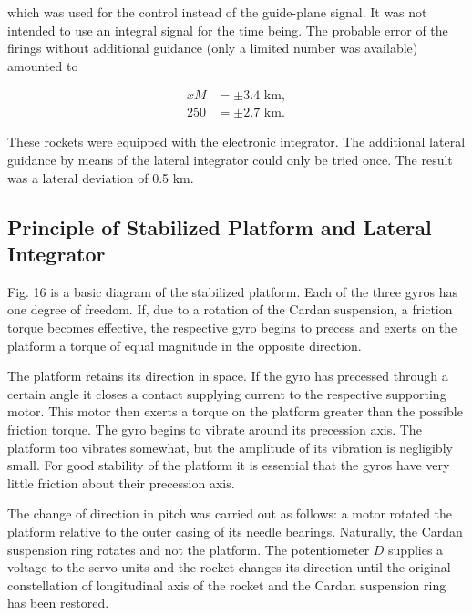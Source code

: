 \documentclass[12pt, a4paper]{article}
\begin{document}
\begin{equation}
\end{equation}

which was used for the control instead of the guide-plane signal. It was not intended to use an integral signal for the time being. The probable error of the firings without additional guidance (only a limited number was available) amounted to

\begin{equation*}
  \begin{split}
    x M&=\pm3.4\text{ km},\\
    250&=\pm2.7\text{ km}.
  \end{split}
\end{equation*}

These rockets were equipped with the electronic integrator. The additional lateral guidance by means of the lateral integrator could only be tried once. The result was a lateral deviation of 0.5 km.

\subsection{Principle of Stabilized Platform and Lateral Integrator}

Fig. 16 is a basic diagram of the stabilized platform. Each of the three gyros has one degree of freedom. If, due to a rotation of the Cardan suspension, a friction torque becomes effective, the respective gyro begins to precess and exerts on the platform a torque of equal magnitude in the opposite direction.

The platform retains its direction in space. If the gyro has precessed through a certain angle it closes a contact supplying current to the respective supporting motor. This motor then exerts a torque on the platform greater than the possible friction torque. The gyro begins to vibrate around its precession axis. The platform too vibrates somewhat, but the amplitude of its vibration is negligibly small. For good stability of the platform it is essential that the gyros have very little friction about their precession axis.

The change of direction in pitch was carried out as follows: a motor rotated the platform relative to the outer casing of its needle bearings. Naturally, the Cardan suspension ring rotates and not the platform. The potentiometer $D$ supplies a voltage to the servo-units and the rocket changes its direction until the original constellation of longitudinal axis of the rocket and the Cardan suspension ring has been restored.
\end{document}
